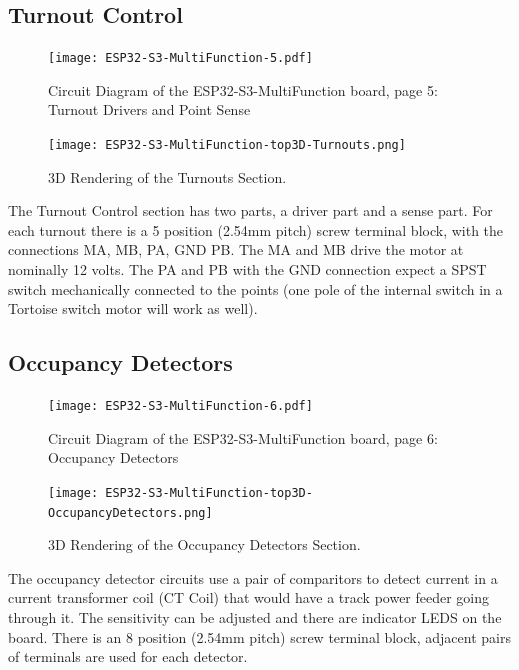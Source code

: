\subsection{Turnout Control} 
\begin{figure}[hbpt]\begin{centering}%
\texttt{[image: ESP32-S3-MultiFunction-5.pdf]}
\caption{Circuit Diagram of the ESP32-S3-MultiFunction board, page 5: Turnout 
Drivers and Point Sense}
\end{centering}\end{figure}
\begin{figure}[hbpt]\begin{centering}%
\texttt{[image: ESP32-S3-MultiFunction-top3D-Turnouts.png]}
\caption{3D Rendering of the Turnouts Section.}
\end{centering}\end{figure}

The Turnout Control section has two parts, a driver part and a sense part.  
For each turnout there is a 5 position (2.54mm pitch) screw terminal block, 
with the connections MA, MB, PA, GND PB.   The MA and MB drive the motor at 
nominally 12 volts.  The PA and PB with the GND connection expect a SPST 
switch mechanically connected to the points (one pole of the internal switch 
in a Tortoise switch motor will work as well).

\clearpage
\subsection{Occupancy Detectors}
\begin{figure}[hbpt]\begin{centering}%
\texttt{[image: ESP32-S3-MultiFunction-6.pdf]}
\caption{Circuit Diagram of the ESP32-S3-MultiFunction board, page 6: 
Occupancy Detectors}
\end{centering}\end{figure}
\begin{figure}[hbpt]\begin{centering}%
\texttt{[image: ESP32-S3-MultiFunction-top3D-OccupancyDetectors.png]}
\caption{3D Rendering of the Occupancy Detectors Section.}
\end{centering}\end{figure}

The occupancy detector circuits use a pair of comparitors to detect current in 
a current transformer coil (CT Coil) that would have a track power feeder 
going through it.  The sensitivity can be adjusted and there are indicator 
LEDS on the board.  There is an 8 position (2.54mm pitch) screw terminal 
block, adjacent pairs of terminals are used for each detector.

